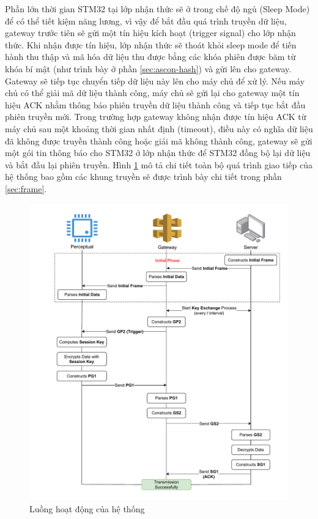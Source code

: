 Phần lớn thời gian STM32 tại lớp nhận thức sẽ ở trong chế độ ngủ (Sleep Mode) để có thể tiết kiệm năng lương, vì vậy để bắt đầu quá trình truyền dữ liệu, gateway trước tiên sẽ gửi một tín hiệu kích hoạt (trigger signal) cho lớp nhận thức. Khi nhận được tín hiệu, lớp nhận thức sẽ thoát khỏi sleep mode để tiến hành thu thập và mã hóa dữ liệu thu được bằng các khóa phiên được băm từ khóa bí mật (như trình bày ở phần \ref{sec:ascon-hash}) và gửi lên cho gateway. Gateway sẽ tiếp tục chuyển tiếp dữ liệu này lên cho máy chủ để xử lý. Nếu máy chủ có thể giải mã dữ liệu thành công, máy chủ sẽ gửi lại cho gateway một tín hiệu ACK nhằm thông báo phiên truyền dữ liệu thành công và tiếp tục bắt đầu phiên truyền mới. Trong trường hợp gateway không nhận được tín hiệu ACK từ máy chủ sau một khoảng thời gian nhất định (timeout), điều này có nghĩa dữ liệu đã không được truyền thành công hoặc giải mã không thành công, gateway sẽ gửi một gói tin thông báo cho STM32 ở lớp nhận thức để STM32 đồng bộ lại dữ liệu và bắt đầu lại phiên truyền. Hình \ref{fig:trans-sys} mô tả chi tiết toàn bộ quá trình giao tiếp của hệ thống bao gồm các khung truyền sẽ được trình bày chi tiết trong phần \ref{sec:frame}.

\begin{figure}[htbp]
    \centering
    \includegraphics[width=1\linewidth]{trans-sys.pdf}
    \caption{Luồng hoạt động của hệ thống}
    \label{fig:trans-sys}
\end{figure}

